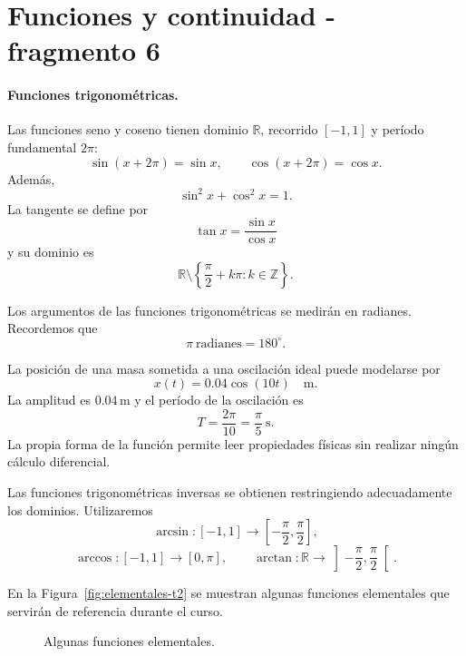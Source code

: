 \section{Funciones y continuidad - fragmento 6}
\paragraph{Funciones trigonométricas.}
Las funciones seno y coseno tienen dominio $\mathbb{R}$, recorrido $[-1,1]$ y período fundamental $2\pi$:
\[
\sin(x+2\pi)=\sin x,
\qquad
\cos(x+2\pi)=\cos x.
\]
Además,
\[
\sin^2x+\cos^2x=1.
\]
La tangente se define por
\[
\tan x=\frac{\sin x}{\cos x}
\]
y su dominio es
\[
\mathbb{R}\setminus\left\{\frac{\pi}{2}+k\pi:k\in\mathbb{Z}\right\}.
\]

Los argumentos de las funciones trigonométricas se medirán en radianes. Recordemos que
\[
\pi\ \text{radianes}=180^\circ.
\]

\begin{example}
La posición de una masa sometida a una oscilación ideal puede modelarse por
\[
x(t)=0.04\cos(10t)\quad \text{m}.
\]
La amplitud es $0.04\,\mathrm{m}$ y el período de la oscilación es
\[
T=\frac{2\pi}{10}=\frac{\pi}{5}\ \mathrm{s}.
\]
La propia forma de la función permite leer propiedades físicas sin realizar ningún cálculo diferencial.
\end{example}

Las funciones trigonométricas inversas se obtienen restringiendo adecuadamente los dominios. Utilizaremos
\[
\arcsin:[-1,1]\to\left[-\frac\pi2,\frac\pi2\right],
\]
\[
\arccos:[-1,1]\to[0,\pi],
\qquad
\arctan:\mathbb{R}\to\left]-\frac\pi2,\frac\pi2\right[.
\]

En la Figura~\ref{fig:elementales-t2} se muestran algunas funciones elementales que servirán de referencia durante el curso.

\begin{figure}[H]
\centering
{}
\caption{Algunas funciones elementales.}

\end{figure}

